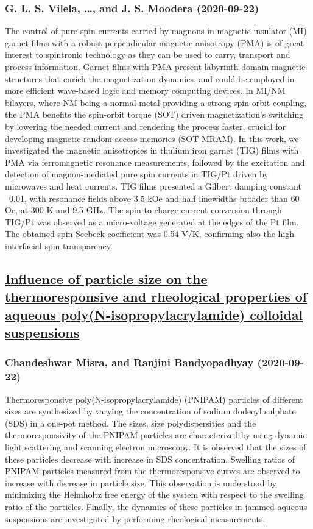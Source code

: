{\subsubsection*{G. L. S. Vilela, \dots, and J. S. Moodera (2020-09-22)}
The control of pure spin currents carried by magnons in magnetic insulator
(MI) garnet films with a robust perpendicular magnetic anisotropy (PMA) is of
great interest to spintronic technology as they can be used to carry, transport
and process information. Garnet films with PMA present labyrinth domain
magnetic structures that enrich the magnetization dynamics, and could be
employed in more efficient wave-based logic and memory computing devices. In
MI/NM bilayers, where NM being a normal metal providing a strong spin-orbit
coupling, the PMA benefits the spin-orbit torque (SOT) driven magnetization's
switching by lowering the needed current and rendering the process faster,
crucial for developing magnetic random-access memories (SOT-MRAM). In this
work, we investigated the magnetic anisotropies in thulium iron garnet (TIG)
films with PMA via ferromagnetic resonance measurements, followed by the
excitation and detection of magnon-mediated pure spin currents in TIG/Pt driven
by microwaves and heat currents. TIG films presented a Gilbert damping constant
{\alpha}~0.01, with resonance fields above 3.5 kOe and half linewidths broader
than 60 Oe, at 300 K and 9.5 GHz. The spin-to-charge current conversion through
TIG/Pt was observed as a micro-voltage generated at the edges of the Pt film.
The obtained spin Seebeck coefficient was 0.54 {\mu}V/K, confirming also the
high interfacial spin transparency.

\subsection*{\href{http://arxiv.org/abs/2009.10296v1}{Influence of particle size on the thermoresponsive and rheological  properties of aqueous poly(N-isopropylacrylamide) colloidal suspensions}}
\subsubsection*{Chandeshwar Misra, and Ranjini Bandyopadhyay (2020-09-22)}
Thermoresponsive poly(N-isopropylacrylamide) (PNIPAM) particles of different
sizes are synthesized by varying the concentration of sodium dodecyl sulphate
(SDS) in a one-pot method. The sizes, size polydispersities and the
thermoresponsivity of the PNIPAM particles are characterized by using dynamic
light scattering and scanning electron microscopy. It is observed that the
sizes of these particles decrease with increase in SDS concentration. Swelling
ratios of PNIPAM particles measured from the thermoresponsive curves are
observed to increase with decrease in particle size. This observation is
understood by minimizing the Helmholtz free energy of the system with respect
to the swelling ratio of the particles. Finally, the dynamics of these
particles in jammed aqueous suspensions are investigated by performing
rheological measurements.

}

